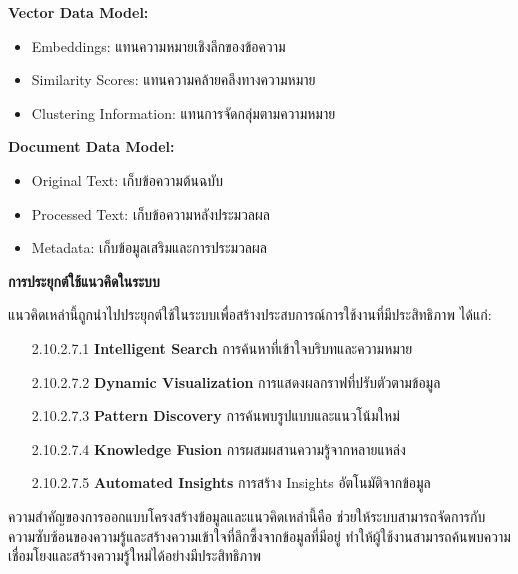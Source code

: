 \documentclass[12pt,a4paper]{article}
\begin{document}
\begin{enumerate}[leftmargin=2cm]
\begin{enumerate}
{\begin{enumerate}
            \textbf{Vector Data Model:}
            \begin{itemize}
                \item Embeddings: แทนความหมายเชิงลึกของข้อความ
                \item Similarity Scores: แทนความคล้ายคลึงทางความหมาย
                \item Clustering Information: แทนการจัดกลุ่มตามความหมาย
            \end{itemize}

            \textbf{Document Data Model:}
            \begin{itemize}
                \item Original Text: เก็บข้อความต้นฉบับ
                \item Processed Text: เก็บข้อความหลังประมวลผล
                \item Metadata: เก็บข้อมูลเสริมและการประมวลผล
            \end{itemize}

            \vspace{0.5cm}

            \textbf{การประยุกต์ใช้แนวคิดในระบบ}

            \hspace{1cm}แนวคิดเหล่านี้ถูกนำไปประยุกต์ใช้ในระบบเพื่อสร้างประสบการณ์การใช้งานที่มีประสิทธิภาพ ได้แก่:

            \begin{enumerate}
                \item[2.10.2.7.1] \textbf{Intelligent Search} การค้นหาที่เข้าใจบริบทและความหมาย
                \item[2.10.2.7.2] \textbf{Dynamic Visualization} การแสดงผลกราฟที่ปรับตัวตามข้อมูล
                \item[2.10.2.7.3] \textbf{Pattern Discovery} การค้นพบรูปแบบและแนวโน้มใหม่
                \item[2.10.2.7.4] \textbf{Knowledge Fusion} การผสมผสานความรู้จากหลายแหล่ง
                \item[2.10.2.7.5] \textbf{Automated Insights} การสร้าง Insights อัตโนมัติจากข้อมูล
            \end{enumerate}

            \hspace{1cm}ความสำคัญของการออกแบบโครงสร้างข้อมูลและแนวคิดเหล่านี้คือ ช่วยให้ระบบสามารถจัดการกับความซับซ้อนของความรู้และสร้างความเข้าใจที่ลึกซึ้งจากข้อมูลที่มีอยู่ ทำให้ผู้ใช้งานสามารถค้นพบความเชื่อมโยงและสร้างความรู้ใหม่ได้อย่างมีประสิทธิภาพ


\end{enumerate}}
\end{enumerate}
\end{enumerate}
\end{document}

